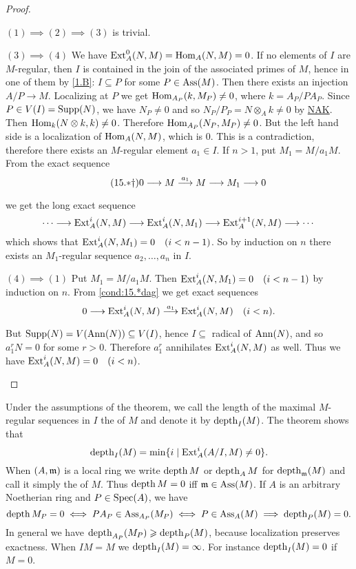 \documentclass[../main]{subfiles}
\begin{document}
\begin{proof}\phantom{,}
\begin{implyenumerate}
    \item[$(1)\implies(2)\implies(3)$] is trivial.
    \item[$(3)\implies(4)$]We have $\operatorname{Ext}_A^0(N, M)=\operatorname{Hom}_A(N, M)=0$. If no elements of $I$ are $M$-regular, then $I$ is contained in the join of the associated primes of $M$, hence in one of them by \ref{1.B}: $I\subseteq P$ for some $P \in \operatorname{Ass}(M)$. Then there exists an injection $A / P \longrightarrow M$. Localizing at $P$ we get $\operatorname{Hom}_{A_P}(k, M_P) \neq 0$, where $k=A_P/PA_P$. Since $P \in V(I)=\operatorname{Supp}(N)$, we have $N_P \neq 0$ and so $N_P / P_P=N \otimes_A k \neq 0$ by \hyperref[NAK]{NAK}. Then $\operatorname{Hom}_k(N \otimes k, k) \neq 0$. Therefore $\operatorname{Hom}_{A_P}(N_P, M_P) \neq0$. But the left hand side is a localization of $\operatorname{Hom}_A(N, M)$, which is $0$. This is a contradiction, therefore there exists an $M$-regular element $a_1 \in I$. If $n>1$, put $M_1=M / a_1 M$. From the exact sequence
    \[\tag{15.$\ast \dagger$} \label{cond:15.*dag}0\longrightarrow M\varrightarrow{a_1}M\longrightarrow M_1\longrightarrow 0
    \]
    we get the long exact sequence \[\cdots\longrightarrow\operatorname{Ext}_A^i(N, M)\longrightarrow\operatorname{Ext}_A^i(N, M_1) \longrightarrow \operatorname{Ext}_A^{i+1}(N, M) \longrightarrow \cdots\] which shows that $\Ext_A^i(N, M_1)=0\for{i<n-1}$. So by induction on $n$ there exists an $M_1$-regular sequence $a_2, \ldots, a_n$ in $I$.
    \item[$(4)\implies(1)$] Put $M_1=M / a_1 M$. Then $\Ext_A^i(N, M_1)=0\for{i<n-1}$ by induction on $n$. From \ref{cond:15.*dag} we get exact sequences \[0 \longrightarrow \Ext_A^i(N, M) \varrightarrow{a_1}\Ext_{A}^{i}(N, M)\quad(i<n).\] But $\operatorname{Supp}(N)=V(\operatorname{Ann}(N)) \subseteq V(I)$, hence $I \subseteq$ radical of $\operatorname{Ann}(N)$, and so $a_1^r N=0$ for some $r>0$. Therefore $a_1^r$ annihilates $\operatorname{Ext}_A^i(N, M)$ as well. Thus we have $\Ext_A^i(N, M)=0\for{i<n}$.
\end{implyenumerate}
\end{proof}

Under the assumptions of the theorem, we call the length of the maximal $M$-regular sequences in $I$ the  of $M$ and denote it by $\operatorname{depth}_I(M)$. The theorem shows that \[\operatorname{depth}_I(M)=\min \{i \mid \operatorname{Ext}_A^i(A / I, M) \neq 0\}.\] When $(A,\mathfrak{m})$ is a local ring we write $\operatorname{depth} M$ or $\operatorname{depth}_AM$ for $\operatorname{depth}_{\mathfrak{m}}(M)$ and call it simply the  of $M$. Thus $\operatorname{depth} M=0$ iff $\mathfrak{m} \in \operatorname{Ass}(M)$. If $A$ is an arbitrary Noetherian ring and $P \in \operatorname{Spec}(A)$, we have \[\operatorname{depth} M_P=0 \iff P A_P \in\operatorname{Ass}_{A_P}(M_P) \iff P \in\operatorname{Ass}_A(M)\implies \operatorname{depth}_P(M)=0.\] In general we have $\operatorname{depth}_{A_P}(M_P) \geqslant \operatorname{depth}_P(M)$, because localization preserves exactness. When $I M=M$ we $\operatorname{depth}_I(M)=\infty$. For instance $\operatorname{depth}_I(M)=0$ if $M=0$.
\end{document}
